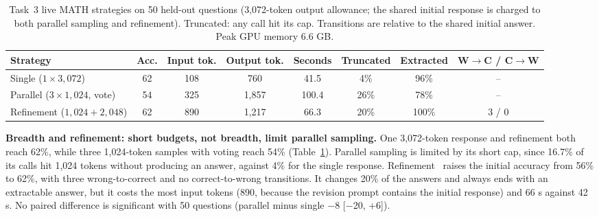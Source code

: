\documentclass{article}
\newcommand{\ci}[2]{{\scriptsize[#1, #2]}}
\begin{document}
\begin{table}[t]
\centering
\caption{Task~3 live MATH strategies on 50 held-out questions (3,072-token output allowance; the shared initial response is charged to both parallel sampling and refinement). Truncated: any call hit its cap. Transitions are relative to the shared initial answer. Peak GPU memory 6.6 GB.}
\label{tab:live}
\small
\setlength{\tabcolsep}{2.8pt}
\begin{tabular}{lccccccc}
\toprule
Strategy & Acc. & Input tok. & Output tok. & Seconds & Truncated & Extracted & W$\to$C / C$\to$W\\
\midrule
Single ($1\times3{,}072$) & 62 & 108 & 760 & 41.5 & 4\% & 96\% & --\\
Parallel ($3\times1{,}024$, vote) & 54 & 325 & 1,857 & 100.4 & 26\% & 78\% & --\\
Refinement ($1{,}024+2{,}048$) & 62 & 890 & 1,217 & 66.3 & 20\% & 100\% & 3 / 0\\
\bottomrule
\end{tabular}
\end{table}

\textbf{Breadth and refinement: short budgets, not breadth, limit parallel sampling.} One 3,072-token response and refinement both reach 62\%, while three 1,024-token samples with voting reach 54\% (Table~\ref{tab:live}). Parallel sampling is limited by its short cap, since 16.7\% of its calls hit 1,024 tokens without producing an answer, against 4\% for the single response. Refinement~\cite{madaan2023selfrefine} raises the initial accuracy from 56\% to 62\%, with three wrong-to-correct and no correct-to-wrong transitions. It changes 20\% of the answers and always ends with an extractable answer, but it costs the most input tokens (890, because the revision prompt contains the initial response) and 66 s against 42 s. No paired difference is significant with 50 questions (parallel minus single $-8$ \ci{$-$20}{+6}).
\end{document}
